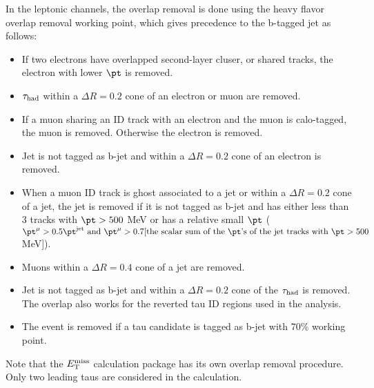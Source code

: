 In the leptonic channels, the overlap removal is done using the heavy flavor overlap removal working point, which gives precedence to the b-tagged jet as follows:
\begin{itemize}
\item If two electrons have overlapped second-layer cluser, or shared tracks, the electron with lower $\pt$ is removed.
\item $\tau_\text{had}$ within a $\Delta R=0.2$ cone of an electron or muon are removed.
\item If a muon sharing an ID track with an electron and the muon is calo-tagged, the muon is removed. Otherwise the electron is removed.
\item Jet is not tagged as b-jet and within a $\Delta R=0.2$ cone of an electron is removed.
\item When a muon ID track is ghost associated to a jet or within a $\Delta R=0.2$ cone of a jet, the jet is removed if it is not tagged as b-jet and has either less than 3 tracks with $\pt>500$ MeV or
  has a relative small $\pt$ ($\pt^{\mu}>0.5\pt^{\text{jet}} \text{ and } \pt^{\mu}>0.7[\text{the scalar sum of the } \pt \text{'s of the jet tracks with } \pt>500$ MeV]).
\item Muons within a $\Delta R=0.4$ cone of a jet are removed.
\item Jet is not tagged as b-jet and within a $\Delta R=0.2$ cone of the $\tau_\text{had}$ is removed. The overlap also works for the reverted tau ID regions used in the analysis.
\item The event is removed if a tau candidate is tagged as b-jet with 70\% working point.
\end{itemize}

Note that the $E_{\text{T}}^{\text{miss}}$ calculation package has its own overlap removal procedure. Only two leading taus are considered in the calculation.
